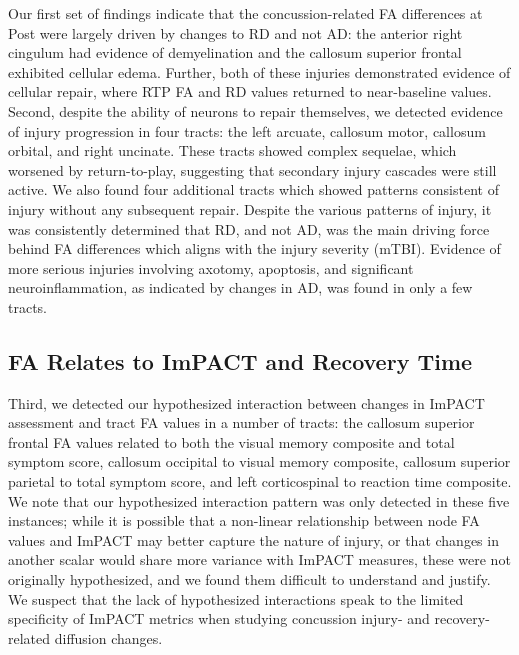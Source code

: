 \documentclass[]{imag-ms-template}
\begin{document}
Our first set of findings indicate that the concussion-related FA differences at Post were largely driven by changes to RD and not AD: the anterior right cingulum had evidence of demyelination and the callosum superior frontal exhibited cellular edema. Further, both of these injuries demonstrated evidence of cellular repair, where RTP FA and RD values returned to near-baseline values. Second, despite the ability of neurons to repair themselves, we detected evidence of injury progression in four tracts: the left arcuate, callosum motor, callosum orbital, and right uncinate. These tracts showed complex sequelae, which worsened by return-to-play, suggesting that secondary injury cascades were still active. We also found four additional tracts which showed patterns consistent of injury without any subsequent repair. Despite the various patterns of injury, it was consistently determined that RD, and not AD, was the main driving force behind FA differences which aligns with the injury severity (mTBI). Evidence of more serious injuries involving axotomy, apoptosis, and significant neuroinflammation, as indicated by changes in AD, was found in only a few tracts.


\subsection{FA Relates to ImPACT and Recovery Time}
\label{ssec:disc-impact}
Third, we detected our hypothesized interaction between changes in ImPACT assessment and tract FA values in a number of tracts: the callosum superior frontal FA values related to both the visual memory composite and total symptom score, callosum occipital to visual memory composite, callosum superior parietal to total symptom score, and left corticospinal to reaction time composite. We note that our hypothesized interaction pattern was only detected in these five instances; while it is possible that a non-linear relationship between node FA values and ImPACT may better capture the nature of injury, or that changes in another scalar would share more variance with ImPACT measures, these were not originally hypothesized, and we found them difficult to understand and justify. We suspect that the lack of hypothesized interactions speak to the limited specificity of ImPACT metrics \parencite{schatz2013SensitivitySpecificityOnline} when studying concussion injury- and recovery-related diffusion changes.
\end{document}
